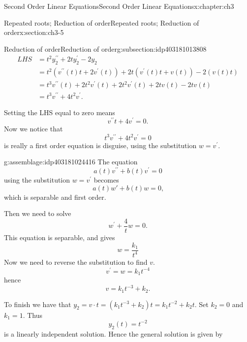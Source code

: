 \documentclass[oneside,10pt,]{book}
\numberwithin{equation}{section}
\numberwithin{equation}{section}
\newcommand{\amp}{&}
\begin{document}
\begin{chapterptx}{Second Order Linear Equations}{}{Second Order Linear Equations}{}{}{x:chapter:ch3}
\begin{sectionptx}{Repeated roots; Reduction of order}{}{Repeated roots; Reduction of order}{}{}{x:section:ch3-5}
\begin{subsectionptx}{Reduction of order}{}{Reduction of order}{}{}{g:subsection:idp403181013808}
\begin{align*}
LHS\amp =t^{2}y_{2}^{\prime\prime}+2ty_{2}^{\prime}-2y_{2}\\
\amp =t^{2}\left(v^{\prime\prime}(t)t+2v^{\prime}(t)\right) +2t\left(v^{\prime}(t)t+v(t)\right) -2\left(v(t)t\right)\\
\amp =t^{3}v^{\prime\prime}(t)+2t^{2}v^{\prime}(t) +2t^{2}v^{\prime}(t)+2tv(t) -2tv(t)\\
\amp= t^{3}v^{\prime\prime}+4t^{2}v^{\prime}.
\end{align*}
%
\par
Setting the LHS equal to zero means%
\begin{equation*}
v^{\prime\prime}t+4v^{\prime}=0.
\end{equation*}
Now we notice that%
\begin{equation*}
t^{3}v^{\prime\prime}+4t^{2}v^{\prime}=0
\end{equation*}
is really a first order equation is disguise, using the substitution \(w=v^{\prime}\). \begin{assemblage}{}{g:assemblage:idp403181024416}%
The equation%
\begin{equation*}
a(t)v^{\prime\prime}+b(t)v^{\prime}=0
\end{equation*}
using the substitution \(w=v^{\prime}\) becomes%
\begin{equation*}
a(t) w' + b(t) w = 0\text{,}
\end{equation*}
which is separable and first order.%
\end{assemblage}
 Then we need to solve%
\begin{equation*}
w^{\prime}+\frac{4}{t}w=0.
\end{equation*}
This equation is separable, and gives%
\begin{equation*}
w = \frac{k_{1}}{t^{4}}
\end{equation*}
Now we need to reverse the substitution to find \(v\).%
\begin{equation*}
v^{\prime}=w=k_{1}t^{-4}
\end{equation*}
hence%
\begin{equation*}
v=k_{1}t^{-3}+k_{2}.
\end{equation*}
%
\par
To finish we have that \(y_{2}=v\cdot t=\left(k_{1}t^{-3}+k_{2}\right)t=k_{1}t^{-2}+k_{2}t\). Set \(k_{2}=0\) and \(k_{1}=1\). Thus%
\begin{equation*}
y_{2}(t)=t^{-2}
\end{equation*}
is a linearly independent solution. Hence the general solution is given by%
\begin{align*}

\end{align*}
\end{subsectionptx}
\end{sectionptx}
\end{chapterptx}
\end{document}

